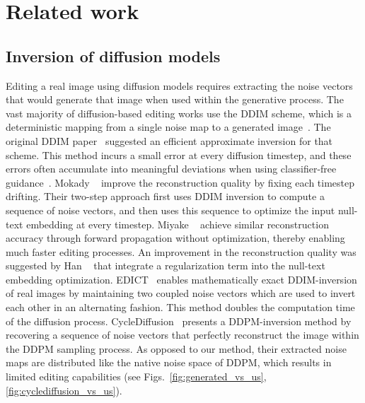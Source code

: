 \section{Related work}
\label{related}



\subsection{Inversion of diffusion models}
Editing a real image using diffusion models requires extracting the noise vectors that would generate that image when used within the generative process. %
The vast majority of diffusion-based editing works use the DDIM scheme, which is a deterministic mapping from a single noise map to a generated image~\cite{Hertz22,Mokady22,Narek22,Guillaume22,Bram22,Parmar23,Adham22}. The original DDIM paper~\cite{Song21} suggested an efficient approximate inversion for that scheme. This method incurs a small error at every diffusion timestep, and these errors often accumulate into meaningful deviations when using classifier-free guidance~\cite{Ho21}. Mokady \etal~\cite{Mokady22} improve the reconstruction quality by fixing each timestep drifting. Their two-step approach first uses DDIM inversion to compute a sequence of noise vectors, and then uses this sequence to optimize the input null-text embedding at every timestep. Miyake \etal~\cite{miyake23}
achieve similar reconstruction accuracy through forward propagation without optimization, thereby enabling much faster editing processes. An improvement in the reconstruction quality was suggested by Han \etal~\cite{Han23} that integrate a regularization term into the null-text embedding optimization. %
EDICT~\cite{Bram22} enables mathematically exact DDIM-inversion of real images by maintaining two coupled noise vectors which are used to invert each other in an alternating fashion. This method doubles the computation time of the diffusion process. %
CycleDiffusion~\cite{Wu22} presents a DDPM-inversion method by recovering a sequence of noise vectors that perfectly reconstruct the image within the DDPM sampling process. As opposed to our method, their extracted noise maps are distributed like the native noise space of DDPM, which results in limited editing capabilities (see Figs.~\ref{fig:generated_vs_us},\ref{fig:cyclediffusion_vs_us}).

